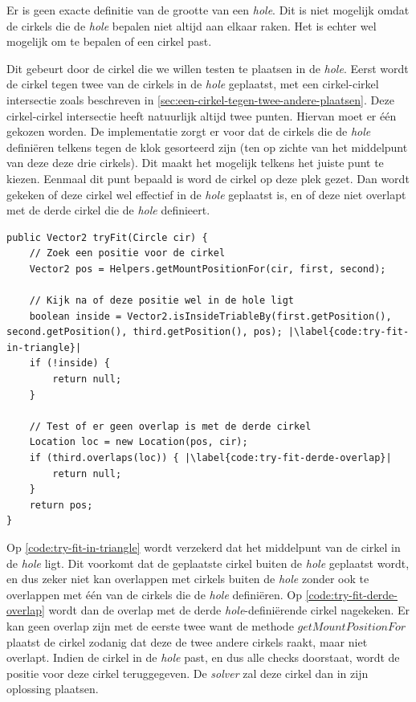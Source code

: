 \documentclass[12pt,a4paper,oneside]{book}
\begin{document}
Er is geen exacte definitie van de grootte van een \textit{hole}.
Dit is niet mogelijk omdat de cirkels die de \textit{hole} bepalen niet altijd aan elkaar raken.
Het is echter wel mogelijk om te bepalen of een cirkel past.

Dit gebeurt door de cirkel die we willen testen te plaatsen in de \textit{hole}.
Eerst wordt de cirkel tegen twee van de cirkels in de \textit{hole} geplaatst, met een cirkel-cirkel intersectie zoals beschreven in \autoref{sec:een-cirkel-tegen-twee-andere-plaatsen}.
Deze cirkel-cirkel intersectie heeft natuurlijk altijd twee punten.
Hiervan moet er één gekozen worden.
De implementatie zorgt er voor dat de cirkels die de \textit{hole} definiëren telkens tegen de klok gesorteerd zijn (ten op zichte van het middelpunt van deze deze drie cirkels).
Dit maakt het mogelijk telkens het juiste punt te kiezen.
Eenmaal dit punt bepaald is word de cirkel op deze plek gezet.
Dan wordt gekeken of deze cirkel wel effectief in de \textit{hole} geplaatst is, en of deze niet overlapt met de derde cirkel die de \textit{hole} definieert.

\begin{lstlisting}
public Vector2 tryFit(Circle cir) {
	// Zoek een positie voor de cirkel
	Vector2 pos = Helpers.getMountPositionFor(cir, first, second);

	// Kijk na of deze positie wel in de hole ligt
	boolean inside = Vector2.isInsideTriableBy(first.getPosition(), second.getPosition(), third.getPosition(), pos); |\label{code:try-fit-in-triangle}|
	if (!inside) {
		return null;
	}

	// Test of er geen overlap is met de derde cirkel
	Location loc = new Location(pos, cir);
	if (third.overlaps(loc)) { |\label{code:try-fit-derde-overlap}|
		return null;
	}
	return pos;
}
\end{lstlisting}

Op \autoref{code:try-fit-in-triangle} wordt verzekerd dat het middelpunt van de cirkel in de \textit{hole} ligt.
Dit voorkomt dat de geplaatste cirkel buiten de \textit{hole} geplaatst wordt, en dus zeker niet kan overlappen met cirkels buiten de \textit{hole} zonder ook te overlappen met één van de cirkels die de \textit{hole} definiëren.
Op \autoref{code:try-fit-derde-overlap} wordt dan de overlap met de derde \textit{hole}-definiërende cirkel nagekeken.
Er kan geen overlap zijn met de eerste twee want de methode $getMountPositionFor$ plaatst de cirkel zodanig dat deze de twee andere cirkels raakt, maar niet overlapt.
Indien de cirkel in de \textit{hole} past, en dus alle checks doorstaat, wordt de positie voor deze cirkel teruggegeven.
De \textit{solver} zal deze cirkel dan in zijn oplossing plaatsen.
\end{document}
